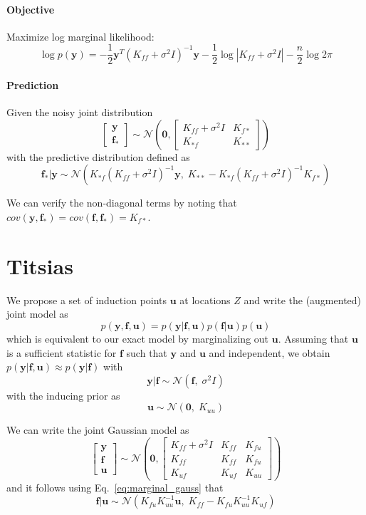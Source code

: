 \documentclass[5p,11pt]{article}
\begin{document}
\paragraph{Objective}
Maximize log marginal likelihood:
$$ \log p(\bm{y}) = -\frac{1}{2}\bm{y}^T(K_{ff}+\sigma^2I)^{-1}\bm{y}-\frac{1}{2}\log |K_{ff}+\sigma^2I| - \frac{n}{2}\log 2 \pi $$

\paragraph{Prediction} Given the noisy joint distribution
\begin{equation}
\begin{bmatrix}\bm{y}\\ \bm{f_*}\end{bmatrix} \sim \mathcal{N}\left(\bm{0}, \begin{bmatrix}K_{ff}+\sigma^2I & K_{f*}\\K_{*f} & K_{**}\end{bmatrix} \right)
\end{equation}
with the predictive distribution defined as
$$ \bm{f}_*|\bm{y} \sim \mathcal{N}(K_{*f}(K_{ff}+\sigma^2I)^{-1}\bm{y},\; K_{**}-K_{*f}(K_{ff}+\sigma^2I)^{-1}K_{f*}) $$

We can verify the non-diagonal terms by noting that $cov(\bm{y},\bm{f}_*) = cov(\bm{f},\bm{f}_*) = K_{f*}$.

\newpage
\section{Titsias}
We propose a set of induction points $\bm{u}$ at locations $Z$ and write the (augmented) joint model as
$$ p(\bm{y},\bm{f},\bm{u}) = p(\bm{y}|\bm{f},\bm{u}) p(\bm{f}|\bm{u}) p(\bm{u}) $$
which is equivalent to our exact model by marginalizing out $\bm{u}$. Assuming that $\bm{u}$ is a sufficient statistic for $\bm{f}$ such that $\bm{y}$ and $\bm{u}$ and independent, we obtain $ p(\bm{y}|\bm{f},\bm{u}) \approx p(\bm{y}|\bm{f})$ with
$$ \bm{y}|\bm{f} \sim \mathcal{N}(\bm{f},\; \sigma^2I) $$
with the inducing prior as
$$ \bm{u} \sim \mathcal{N}(\bm{0},\; K_{uu}) $$

We can write the joint Gaussian model as
\begin{equation}
\begin{bmatrix}\bm{y}\\ \bm{f}\\ \bm{u}\end{bmatrix} \sim \mathcal{N}\left(\bm{0}, \begin{bmatrix}K_{ff}+\sigma^2I & K_{ff} & K_{fu}\\ K_{ff} & K_{ff} & K_{fu}\\ K_{uf} & K_{uf} & K_{uu}\end{bmatrix} \right)
\end{equation}
and it follows using Eq.~\ref{eq:marginal_gauss} that
$$ \bm{f}|\bm{u} \sim \mathcal{N}(K_{fu}K_{uu}^{-1}\bm{u},\; K_{ff}-K_{fu}K_{uu}^{-1}K_{uf}) $$
\end{document}

